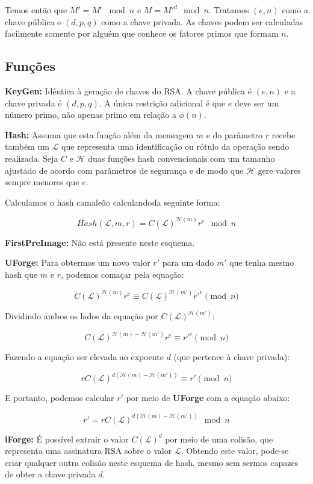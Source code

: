 \documentclass[a4paper]{article}
\begin{document}
Temos então que $M'=M^e \mod n$ e $M=M'^d \mod n$. Tratamos $(e, n)$
como a chave pública e $(d, p, q)$ como a chave privada. As chaves
podem ser calculadas facilmente somente por alguém que conhece os
fatores primos que formam $n$.

\subsection{Funções}

\textbf{KeyGen: } Idêntica à geração de chaves do RSA. A chave pública
é $(e, n)$ e a chave privada é $(d, p, q)$. A única restrição
adicional é que $e$ deve ser um número primo, não apenas primo em
relação a $\phi(n)$.

\textbf{Hash: } Assuma que esta função além da mensagem $m$ e do
parâmetro $r$ recebe também um $\mathcal{L}$ que representa uma
identificação ou rótulo da operação sendo realizada. Seja $C$ e
$\mathcal{H}$ duas funções hash convencionais com um tamanho ajustado
de acordo com parâmetros de segurança e de modo que $\mathcal{H}$ gere
valores sempre menores que $e$.

Calculamos o hash camaleão calculandoda seguinte forma:

$$
Hash(\mathcal{L}, m, r) = C(\mathcal{L})^{\mathcal{H}(m)}r^e \mod n
$$

\textbf{FirstPreImage:} Não está presente neste esquema.

\textbf{UForge:} Para obtermos um novo valor $r'$ para um dado $m'$
que tenha mesmo hash que $m$ e $r$, podemos comaçar pela equação:

$$
C(\mathcal{L})^{\mathcal{H}(m)}r^e \equiv C(\mathcal{L})^{\mathcal{H}(m')}r'^e \pmod n
$$

Dividindo ambos os lados da equação por $C(\mathcal{L})^{\mathcal{H}(m')}$:

$$
C(\mathcal{L})^{\mathcal{H}(m)-\mathcal{H}(m')}r^e \equiv r'^e \pmod n
$$

Fazendo a equação ser elevada ao expoente $d$ (que pertence à chave
privada):

$$
rC(\mathcal{L})^{d(\mathcal{H}(m)-\mathcal{H}(m'))} \equiv r' \pmod n
$$

E portanto, podemos calcular $r'$ por meio de \textbf{UForge} com a
equação abaixo:

$$
r' = rC(\mathcal{L})^{d(\mathcal{H}(m)-\mathcal{H}(m'))} \mod n
$$

\textbf{iForge:} É possível extrair o valor $C(\mathcal{L})^d$ por
meio de uma colisão, que representa uma assinatura RSA sobre o valor
$\mathcal{L}$. Obtendo este valor, pode-se criar qualquer outra
colisão neste esquema de hash, mesmo sem sermos capazes de obter a
chave privada $d$.
\end{document}
